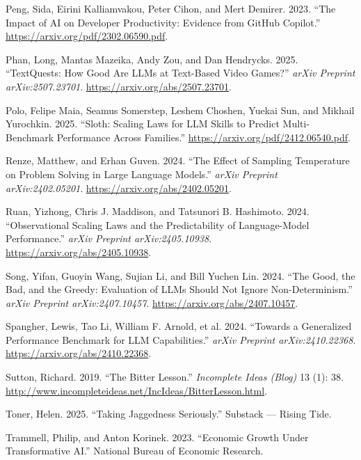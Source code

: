 \documentclass[
  letterpaper,
  DIV=11,
  numbers=noendperiod,
  oneside]{scrartcl}
\newlength{\cslhangindent}
\newenvironment{CSLReferences}[2] %
 {\begin{list}{}{%
  \setlength{\itemindent}{0pt}
  \setlength{\leftmargin}{0pt}
  \setlength{\parsep}{0pt}
  \ifodd #1
   \setlength{\leftmargin}{\cslhangindent}
   \setlength{\itemindent}{-1\cslhangindent}
  \fi
  \setlength{\itemsep}{#2\baselineskip}}}
 {\end{list}}
\begin{document}
\begin{CSLReferences}{1}{0}
Peng, Sida, Eirini Kalliamvakou, Peter Cihon, and Mert Demirer. 2023.
{``The Impact of AI on Developer Productivity: Evidence from GitHub
Copilot.''} \url{https://arxiv.org/pdf/2302.06590.pdf}.

Phan, Long, Mantas Mazeika, Andy Zou, and Dan Hendrycks. 2025.
{``TextQuests: How Good Are LLMs at Text-Based Video Games?''}
\emph{arXiv Preprint arXiv:2507.23701}.
\url{https://arxiv.org/abs/2507.23701}.

Polo, Felipe Maia, Seamus Somerstep, Leshem Choshen, Yuekai Sun, and
Mikhail Yurochkin. 2025. {``Sloth: Scaling Laws for LLM Skills to
Predict Multi-Benchmark Performance Across Families.''}
\url{https://arxiv.org/pdf/2412.06540.pdf}.

Renze, Matthew, and Erhan Guven. 2024. {``The Effect of Sampling
Temperature on Problem Solving in Large Language Models.''} \emph{arXiv
Preprint arXiv:2402.05201}. \url{https://arxiv.org/abs/2402.05201}.

Ruan, Yizhong, Chris J. Maddison, and Tatsunori B. Hashimoto. 2024.
{``Observational Scaling Laws and the Predictability of Language-Model
Performance.''} \emph{arXiv Preprint arXiv:2405.10938}.
\url{https://arxiv.org/abs/2405.10938}.

Song, Yifan, Guoyin Wang, Sujian Li, and Bill Yuchen Lin. 2024. {``The
Good, the Bad, and the Greedy: Evaluation of LLMs Should Not Ignore
Non-Determinism.''} \emph{arXiv Preprint arXiv:2407.10457}.
\url{https://arxiv.org/abs/2407.10457}.

Spangher, Lewis, Tao Li, William F. Arnold, et al. 2024. {``Towards a
Generalized Performance Benchmark for LLM Capabilities.''} \emph{arXiv
Preprint arXiv:2410.22368}. \url{https://arxiv.org/abs/2410.22368}.

Sutton, Richard. 2019. {``The Bitter Lesson.''} \emph{Incomplete Ideas
(Blog)} 13 (1): 38.
\url{http://www.incompleteideas.net/IncIdeas/BitterLesson.html}.

Toner, Helen. 2025. {``Taking Jaggedness Seriously.''} Substack ---
Rising Tide.

Trammell, Philip, and Anton Korinek. 2023. {``Economic Growth Under
Transformative AI.''} National Bureau of Economic Research.


\end{CSLReferences}
\end{document}
